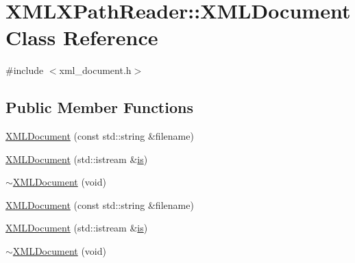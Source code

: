 \hypertarget{classXMLXPathReader_1_1XMLDocument}{}\section{X\+M\+L\+X\+Path\+Reader\+:\+:X\+M\+L\+Document Class Reference}
\label{classXMLXPathReader_1_1XMLDocument}


{\ttfamily \#include $<$xml\+\_\+document.\+h$>$}

\subsection*{Public Member Functions}
\begin{DoxyCompactItemize}
\item 
\mbox{\hyperlink{classXMLXPathReader_1_1XMLDocument_aa7385c1ff92fb49af6fee17de7e6a7d3}{X\+M\+L\+Document}} (const std\+::string \&filename)
\item 
\mbox{\hyperlink{classXMLXPathReader_1_1XMLDocument_aea901941e2389a6c2b0d2d52686f6a99}{X\+M\+L\+Document}} (std\+::istream \&\mbox{\hyperlink{x_8cc_a81abbbdef81e25584a2eab888e643d3d}{is}})
\item 
\mbox{\hyperlink{classXMLXPathReader_1_1XMLDocument_a118c246b3d6018c9d725fdfbafafe46f}{$\sim$\+X\+M\+L\+Document}} (void)
\item 
\mbox{\hyperlink{classXMLXPathReader_1_1XMLDocument_aa7385c1ff92fb49af6fee17de7e6a7d3}{X\+M\+L\+Document}} (const std\+::string \&filename)
\item 
\mbox{\hyperlink{classXMLXPathReader_1_1XMLDocument_aea901941e2389a6c2b0d2d52686f6a99}{X\+M\+L\+Document}} (std\+::istream \&\mbox{\hyperlink{x_8cc_a81abbbdef81e25584a2eab888e643d3d}{is}})
\item 
\mbox{\hyperlink{classXMLXPathReader_1_1XMLDocument_a118c246b3d6018c9d725fdfbafafe46f}{$\sim$\+X\+M\+L\+Document}} (void)
\end{DoxyCompactItemize}
